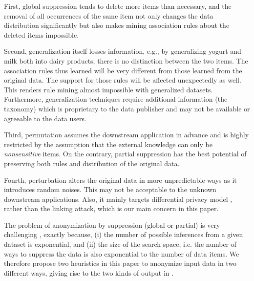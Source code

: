 First, global suppression tends to delete more items than necessary,
and the removal of all occurrences of the same item not only changes the
data distribution significantly but also makes mining association rules
about the deleted items impossible.

Second, generalization itself losses
information, e.g., by generalizing yogurt and milk both into dairy products,
there is no distinction between the two items. The association rules thus
learned will be very different from those learned from the original data. The
support for those rules will be affected unexpectedly as well. This renders
rule mining almost impossible with generalized datasets. Furthermore,
generalization techniques require additional information (the taxonomy) which
is proprietary to the data publisher and may not be available or agreeable to
the data users.

Third, permutation assumes the downstream
application in advance and is highly restricted by the assumption that the
external knowledge can only be {\em nonsensitive} items.
On the contrary, partial suppression has the best potential of
preserving both rules and distribution of the original data.

Fourth, perturbation alters the original
data in more unpredictable ways as it introduces random noises.
This may not be acceptable to the unknown downstream applications.
Also, it mainly targets differential privacy model \cite{ChenMFDX11:Diff},
rather than the linking attack, which is our main concern in this paper.

The problem of anonymization by suppression (global or partial) is very
challenging \cite{atallah99:disclosure,
Xu:2008:ATD}, exactly because, (i) the number of possible inferences from
a given dataset is exponential, and (ii) the size of the search space, i.e.
the number of ways to suppress the data is also exponential to the number of
data items. We therefore propose two heuristics in this paper to anonymize
input data in two different ways, giving rise to the two kinds of output
in .  %

